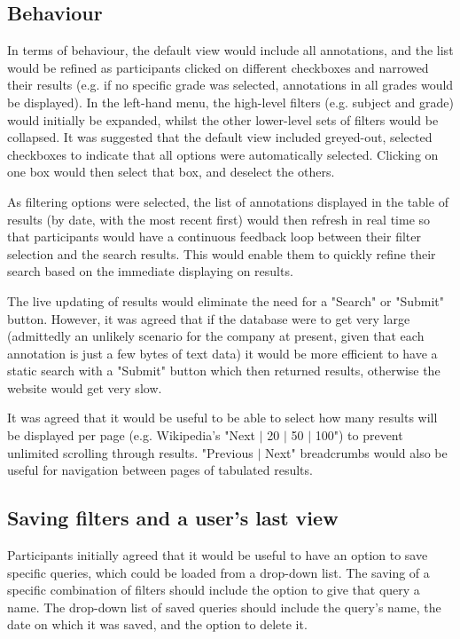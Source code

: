 \subsection{Behaviour}
In terms of behaviour,  the default view would include all annotations, and the list would be refined as participants clicked on different checkboxes and narrowed their results (e.g. if no specific grade was selected, annotations in all grades would be displayed). In the left-hand menu, the high-level filters (e.g. subject and grade) would initially be expanded, whilst the other lower-level sets of filters would be collapsed. It was suggested that the default view included greyed-out, selected checkboxes to indicate that all options were automatically selected. Clicking on one box would then select that box, and deselect the others. 

As filtering options were selected, the list of annotations displayed in the table of results (by date, with the most recent first) would then refresh in real time so that participants would have a continuous feedback loop between their filter selection and the search results. This would enable them to quickly refine their search based on the immediate displaying on results.

The live updating of results would eliminate the need for a "Search" or "Submit" button. However, it was agreed that if the database were to get very large (admittedly an unlikely scenario for the company at present, given that each annotation is just a few bytes of text data) it would be more efficient to have a static search with a "Submit" button which then returned results, otherwise the website would get very slow. 

It was agreed that it would be useful to be able to select how many results will be displayed per page (e.g. Wikipedia's "Next $\vert$ 20 $\vert$ 50 $\vert$ 100") to prevent unlimited scrolling through results. "Previous $\vert$ Next" breadcrumbs would also be useful for navigation between pages of tabulated results. 

\subsection{Saving filters and a user's last view}
Participants initially agreed that it would be useful to have an option to save specific queries, which could be loaded from a drop-down list. The saving of a specific combination of filters should include the option to give that query a name. The drop-down list of saved queries should include the query's name, the date on which it was saved, and the option to delete it.

